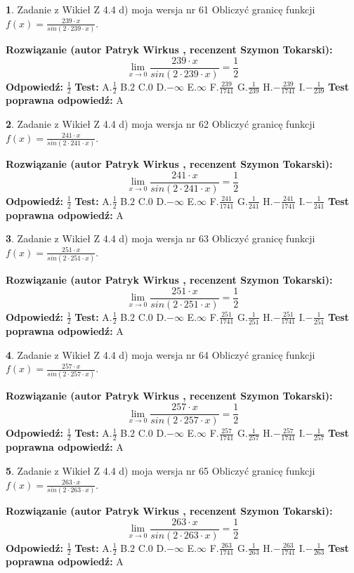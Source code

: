 \documentclass[12pt, a4paper]{article}
\theoremstyle{definition} %
\newtheorem{zad}{}
\newcommand{\zadStart}[1]{\begin{zad}#1\newline}
\newcommand{\zadStop}{\end{zad}}
\newcommand{\rozwStart}[2]{\noindent \textbf{Rozwiązanie (autor #1 , recenzent #2): }\newline}
\newcommand{\rozwStop}{\newline}
\newcommand{\odpStart}{\noindent \textbf{Odpowiedź:}\newline}
\newcommand{\odpStop}{\newline}
\newcommand{\testStart}{\noindent \textbf{Test:}\newline}
\newcommand{\testStop}{\newline}
\newcommand{\kluczStart}{\noindent \textbf{Test poprawna odpowiedź:}\newline}
\newcommand{\kluczStop}{\newline}
\begin{document}
\zadStart{Zadanie z Wikieł Z 4.4 d) moja wersja nr 61}
Obliczyć granicę funkcji $f(x)=\frac{239\cdot x}{sin(2 \cdot239\cdot x)}$.
\zadStop
\rozwStart{Patryk Wirkus}{Szymon Tokarski}
$$\lim\limits_{x\to 0}\frac{239\cdot x}{sin(2 \cdot239\cdot x)}=\frac{1}{2}$$
\rozwStop
\odpStart
$\frac{1}{2}$
\odpStop
\testStart
A.$\frac{1}{2}$
B.$2$
C.$0$
D.$-\infty$
E.$\infty$
F.$\frac{239}{1741}$
G.$\frac{1}{239}$
H.$-\frac{239}{1741}$
I.$-\frac{1}{239}$
\testStop
\kluczStart
A
\kluczStop



\zadStart{Zadanie z Wikieł Z 4.4 d) moja wersja nr 62}
Obliczyć granicę funkcji $f(x)=\frac{241\cdot x}{sin(2 \cdot241\cdot x)}$.
\zadStop
\rozwStart{Patryk Wirkus}{Szymon Tokarski}
$$\lim\limits_{x\to 0}\frac{241\cdot x}{sin(2 \cdot241\cdot x)}=\frac{1}{2}$$
\rozwStop
\odpStart
$\frac{1}{2}$
\odpStop
\testStart
A.$\frac{1}{2}$
B.$2$
C.$0$
D.$-\infty$
E.$\infty$
F.$\frac{241}{1741}$
G.$\frac{1}{241}$
H.$-\frac{241}{1741}$
I.$-\frac{1}{241}$
\testStop
\kluczStart
A
\kluczStop



\zadStart{Zadanie z Wikieł Z 4.4 d) moja wersja nr 63}
Obliczyć granicę funkcji $f(x)=\frac{251\cdot x}{sin(2 \cdot251\cdot x)}$.
\zadStop
\rozwStart{Patryk Wirkus}{Szymon Tokarski}
$$\lim\limits_{x\to 0}\frac{251\cdot x}{sin(2 \cdot251\cdot x)}=\frac{1}{2}$$
\rozwStop
\odpStart
$\frac{1}{2}$
\odpStop
\testStart
A.$\frac{1}{2}$
B.$2$
C.$0$
D.$-\infty$
E.$\infty$
F.$\frac{251}{1741}$
G.$\frac{1}{251}$
H.$-\frac{251}{1741}$
I.$-\frac{1}{251}$
\testStop
\kluczStart
A
\kluczStop



\zadStart{Zadanie z Wikieł Z 4.4 d) moja wersja nr 64}
Obliczyć granicę funkcji $f(x)=\frac{257\cdot x}{sin(2 \cdot257\cdot x)}$.
\zadStop
\rozwStart{Patryk Wirkus}{Szymon Tokarski}
$$\lim\limits_{x\to 0}\frac{257\cdot x}{sin(2 \cdot257\cdot x)}=\frac{1}{2}$$
\rozwStop
\odpStart
$\frac{1}{2}$
\odpStop
\testStart
A.$\frac{1}{2}$
B.$2$
C.$0$
D.$-\infty$
E.$\infty$
F.$\frac{257}{1741}$
G.$\frac{1}{257}$
H.$-\frac{257}{1741}$
I.$-\frac{1}{257}$
\testStop
\kluczStart
A
\kluczStop



\zadStart{Zadanie z Wikieł Z 4.4 d) moja wersja nr 65}
Obliczyć granicę funkcji $f(x)=\frac{263\cdot x}{sin(2 \cdot263\cdot x)}$.
\zadStop
\rozwStart{Patryk Wirkus}{Szymon Tokarski}
$$\lim\limits_{x\to 0}\frac{263\cdot x}{sin(2 \cdot263\cdot x)}=\frac{1}{2}$$
\rozwStop
\odpStart
$\frac{1}{2}$
\odpStop
\testStart
A.$\frac{1}{2}$
B.$2$
C.$0$
D.$-\infty$
E.$\infty$
F.$\frac{263}{1741}$
G.$\frac{1}{263}$
H.$-\frac{263}{1741}$
I.$-\frac{1}{263}$
\testStop
\kluczStart
A
\kluczStop
\end{document}
